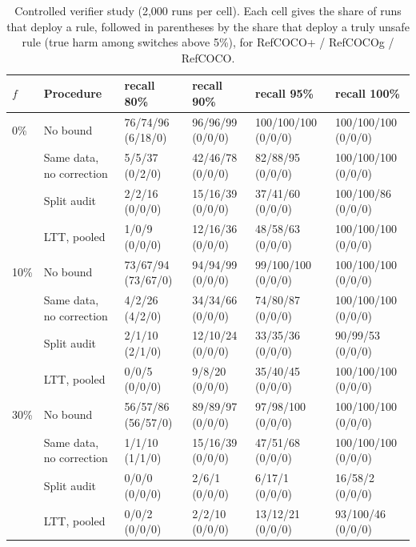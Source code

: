 \begin{table}[t]
\centering
\small
\caption{Controlled verifier study (2,000 runs per cell).  Each cell gives the share of
runs that deploy a rule, followed in parentheses by the share that deploy a truly unsafe
rule (true harm among switches above 5\%), for RefCOCO+ / RefCOCOg / RefCOCO.}
\label{tab:controlled}
\setlength{\tabcolsep}{3pt}
\begin{tabular}{@{}llllll@{}}
\toprule
$f$ & Procedure & recall 80\% & recall 90\% & recall 95\% & recall 100\% \\
\midrule
0\% & No bound & 76/74/96 (6/18/0) & 96/96/99 (0/0/0) & 100/100/100 (0/0/0) & 100/100/100 (0/0/0) \\
 & Same data, no correction & 5/5/37 (0/2/0) & 42/46/78 (0/0/0) & 82/88/95 (0/0/0) & 100/100/100 (0/0/0) \\
 & Split audit & 2/2/16 (0/0/0) & 15/16/39 (0/0/0) & 37/41/60 (0/0/0) & 100/100/86 (0/0/0) \\
 & LTT, pooled & 1/0/9 (0/0/0) & 12/16/36 (0/0/0) & 48/58/63 (0/0/0) & 100/100/100 (0/0/0) \\
\midrule
10\% & No bound & 73/67/94 (73/67/0) & 94/94/99 (0/0/0) & 99/100/100 (0/0/0) & 100/100/100 (0/0/0) \\
 & Same data, no correction & 4/2/26 (4/2/0) & 34/34/66 (0/0/0) & 74/80/87 (0/0/0) & 100/100/100 (0/0/0) \\
 & Split audit & 2/1/10 (2/1/0) & 12/10/24 (0/0/0) & 33/35/36 (0/0/0) & 90/99/53 (0/0/0) \\
 & LTT, pooled & 0/0/5 (0/0/0) & 9/8/20 (0/0/0) & 35/40/45 (0/0/0) & 100/100/100 (0/0/0) \\
\midrule
30\% & No bound & 56/57/86 (56/57/0) & 89/89/97 (0/0/0) & 97/98/100 (0/0/0) & 100/100/100 (0/0/0) \\
 & Same data, no correction & 1/1/10 (1/1/0) & 15/16/39 (0/0/0) & 47/51/68 (0/0/0) & 100/100/100 (0/0/0) \\
 & Split audit & 0/0/0 (0/0/0) & 2/6/1 (0/0/0) & 6/17/1 (0/0/0) & 16/58/2 (0/0/0) \\
 & LTT, pooled & 0/0/2 (0/0/0) & 2/2/10 (0/0/0) & 13/12/21 (0/0/0) & 93/100/46 (0/0/0) \\
\bottomrule
\end{tabular}
\end{table}
